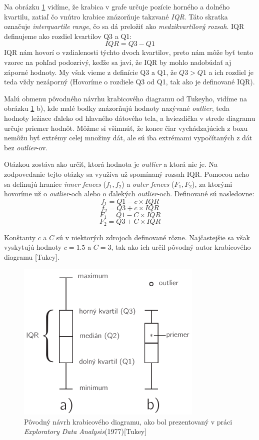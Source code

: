Na obrázku \ref{fig:boxplot} vidíme, že krabica v grafe určuje pozície horného a dolného kvartilu, zatiaľ čo vnútro krabice znázorňuje takzvané \textit{IQR}. Táto skratka označuje \textit{interquartile range}, čo sa dá preložiť ako \textit{medzikvartilový rozsah}. IQR definujeme ako rozdiel kvartilov Q3 a Q1:
\[
	IQR = Q3 - Q1
\]
IQR nám hovorí o vzdialenosti týchto dvoch kvartilov, preto nám môže byť tento vzorec na pohľad podozrivý, keďže sa javí, že IQR by mohlo nadobúdať aj záporné hodnoty. My však vieme z definície Q3 a Q1, že $ Q3 > Q1 $ a ich rozdiel je teda vždy nezáporný (Hovoríme o rozdiele Q3 od Q1, tak ako je definované IQR).

Malú obmenu pôvodného návrhu krabicového diagramu od Tukeyho, vidíme na obrázku \ref{fig:boxplot} b), kde malé bodky znázorňujú hodnoty nazývané \textit{outlier}, teda hodnoty ležiace ďaleko od hlavného dátového tela, a hviezdička v strede diagramu určuje priemer hodnôt. Môžme si všimnúť, že konce čiar vychádzajúcich z boxu nemôžu byť extrémy celej množiny dát, ale sú iba extrémami vypočítaných z dát bez \textit{outlier}-ov.

Otázkou zostáva ako určiť, ktorá hodnota je \textit{outlier} a ktorá nie je. Na zodpovedanie tejto otázky sa využíva už spomínaný rozsah IQR. Pomocou neho sa definujú hranice \textit{inner fences} ($f_{1}, f_{2}$) a \textit{outer fences} ($F_{1}, F_{2}$), za ktorými hovoríme už o \textit{outlier}-och alebo o ďalekých \textit{outlier}-och. Definované sú nasledovne:
\\
\[f_{1} = Q1 - c \times IQR\]	
\[f_{2} = Q3 + c \times IQR\]
\[F_{1} = Q1 - C \times IQR\]
\[F_{2} = Q3 + C \times IQR\]

Konštanty $ c $ a $ C $ sú v niektorých zdrojoch definované rôzne. Najčastejšie sa však vyskytujú hodnoty $ c = 1.5 $ a $ C = 3$, tak ako ich určil pôvodný autor krabicového diagramu [Tukey].

\begin{figure}
	\centering
	\includegraphics[width = 3.5in]{boxplot}
	\caption{Pôvodný návrh krabicového diagramu, ako bol prezentovaný v práci \textit{Exploratory Data Analysis}(1977)[Tukey] }
	\label{fig:boxplot}
\end{figure}


